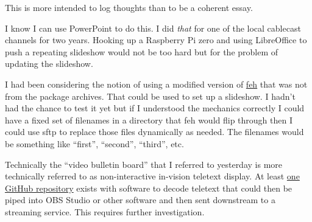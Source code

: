 This is more intended to log thoughts than to be a coherent essay.

I know I can use PowerPoint to do this. I did \emph{that} for one of the
local cablecast channels for two years. Hooking up a Raspberry Pi zero
and using LibreOffice to push a repeating slideshow would not be too
hard but for the problem of updating the slideshow.

I had been considering the notion of using a modified version of
\href{http://web.archive.org/web/20221222032104/https://feh.finalrewind.org/}{feh}
that was not from the package archives. That could be used to set up a
slideshow. I hadn't had the chance to test it yet but if I understood
the mechanics correctly I could have a fixed set of filenames in a
directory that feh would flip through then I could use sftp to replace
those files dynamically as needed. The filenames would be something like
``first'', ``second'', ``third'', etc.

Technically the ``video bulletin board'' that I referred to yesterday is
more technically referred to as non-interactive in-vision teletext
display. At least \href{https://github.com/peterkvt80/vbit-iv}{one
GitHub repository} exists with software to decode teletext that could
then be piped into OBS Studio or other software and then sent downstream
to a streaming service. This requires further investigation.
